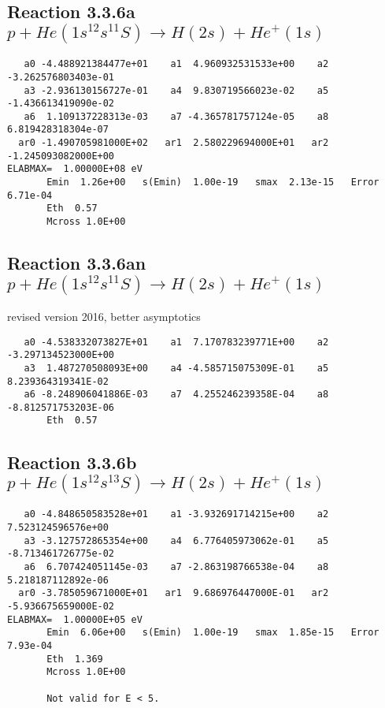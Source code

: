 \documentclass[12pt,dvipdfm]{article}
\begin{document}
\newpage
\subsection{
Reaction 3.3.6a $   p + He(1s^12s^11S) \rightarrow H(2s) + He^+(1s)$}


\begin{small}\begin{verbatim}
   a0 -4.488921384477e+01    a1  4.960932531533e+00    a2 -3.262576803403e-01
   a3 -2.936130156727e-01    a4  9.830719566023e-02    a5 -1.436613419090e-02
   a6  1.109137228313e-03    a7 -4.365781757124e-05    a8  6.819428318304e-07
  ar0 -1.490705981000E+02   ar1  2.580229694000E+01   ar2 -1.245093082000E+00
ELABMAX=  1.00000E+08 eV
       Emin  1.26e+00   s(Emin)  1.00e-19   smax  2.13e-15   Error  6.71e-04
       Eth  0.57
       Mcross 1.0E+00
\end{verbatim}\end{small}


\subsection{
Reaction 3.3.6an $   p + He(1s^12s^11S) \rightarrow H(2s) + He^+(1s)$}
revised version 2016, better asymptotics

\begin{small}\begin{verbatim}
   a0 -4.538332073827E+01    a1  7.170783239771E+00    a2 -3.297134523000E+00
   a3  1.487270508093E+00    a4 -4.585715075309E-01    a5  8.239364319341E-02
   a6 -8.248906041886E-03    a7  4.255246239358E-04    a8 -8.812571753203E-06
       Eth  0.57
\end{verbatim}\end{small}




\newpage
\subsection{
Reaction 3.3.6b $   p + He(1s^12s^13S) \rightarrow H(2s) + He^+(1s)$}


\begin{small}\begin{verbatim}
   a0 -4.848650583528e+01    a1 -3.932691714215e+00    a2  7.523124596576e+00
   a3 -3.127572865354e+00    a4  6.776405973062e-01    a5 -8.713461726775e-02
   a6  6.707424051145e-03    a7 -2.863198766538e-04    a8  5.218187112892e-06
  ar0 -3.785059671000E+01   ar1  9.686976447000E-01   ar2 -5.936675659000E-02
ELABMAX=  1.00000E+05 eV
       Emin  6.06e+00   s(Emin)  1.00e-19   smax  1.85e-15   Error  7.93e-04
       Eth  1.369
       Mcross 1.0E+00

       Not valid for E < 5.
\end{verbatim}\end{small}
\end{document}
